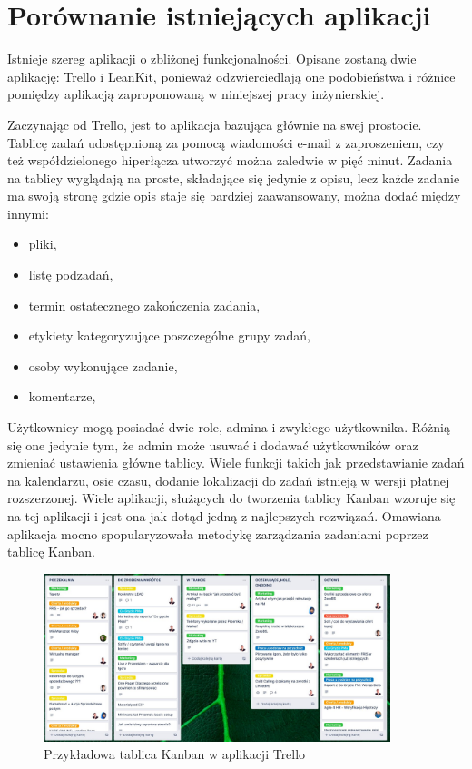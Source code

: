 \section{Porównanie istniejących aplikacji}
Istnieje szereg aplikacji o zbliżonej funkcjonalności. Opisane zostaną dwie aplikację: Trello i LeanKit,  ponieważ odzwierciedlają one podobieństwa i różnice pomiędzy aplikacją zaproponowaną w niniejszej pracy inżynierskiej.


Zaczynając od Trello, jest to aplikacja bazująca głównie na swej prostocie. Tablicę zadań udostępnioną za pomocą wiadomości e-mail z zaproszeniem, czy też współdzielonego hiperłącza utworzyć można zaledwie w pięć minut. Zadania na tablicy wyglądają na proste, składające się jedynie z opisu, lecz każde zadanie ma swoją stronę gdzie opis staje się bardziej zaawansowany, można dodać między innymi:
\begin{itemize}
	\item pliki, 
	\item listę podzadań,
	\item termin ostatecznego zakończenia zadania,
	\item etykiety kategoryzujące poszczególne grupy zadań,
	\item osoby wykonujące zadanie,
	\item komentarze,
\end{itemize}
Użytkownicy mogą posiadać dwie role, admina i zwykłego użytkownika. Różnią się one jedynie tym, że admin może usuwać i dodawać użytkowników oraz zmieniać ustawienia główne tablicy. Wiele funkcji takich jak przedstawianie zadań na kalendarzu, osie czasu, dodanie lokalizacji do zadań istnieją w wersji płatnej rozszerzonej. Wiele aplikacji, służących do tworzenia tablicy Kanban wzoruje się na tej aplikacji i jest ona jak dotąd jedną z najlepszych rozwiązań. Omawiana aplikacja mocno spopularyzowała metodykę zarządzania zadaniami poprzez tablicę Kanban.

\begin{figure}[h]
	\centering
	\includegraphics[width=0.90\textwidth]{tablica-operacyjna}		
	\caption{Przykładowa tablica Kanban w aplikacji Trello}
\end{figure}

